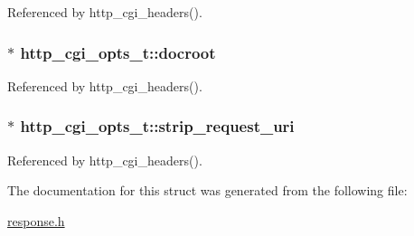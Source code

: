 Referenced by http\-\_\-cgi\-\_\-headers().

\hypertarget{structhttp__cgi__opts__t_a2dac1f6b409deaa93b8f8a8221fddb26}{
\subsubsection[{docroot}]{$\ast$ http\-\_\-cgi\-\_\-opts\-\_\-t\-::docroot}}\label{structhttp__cgi__opts__t_a2dac1f6b409deaa93b8f8a8221fddb26}


Referenced by http\-\_\-cgi\-\_\-headers().

\hypertarget{structhttp__cgi__opts__t_a52d465ab78e6b8d0c00651cbcc9c9640}{
\subsubsection[{strip\-\_\-request\-\_\-uri}]{$\ast$ http\-\_\-cgi\-\_\-opts\-\_\-t\-::strip\-\_\-request\-\_\-uri}}\label{structhttp__cgi__opts__t_a52d465ab78e6b8d0c00651cbcc9c9640}


Referenced by http\-\_\-cgi\-\_\-headers().



The documentation for this struct was generated from the following file\-:\begin{DoxyCompactItemize}
\item 
\hyperlink{response_8h}{response.\-h}\end{DoxyCompactItemize}
